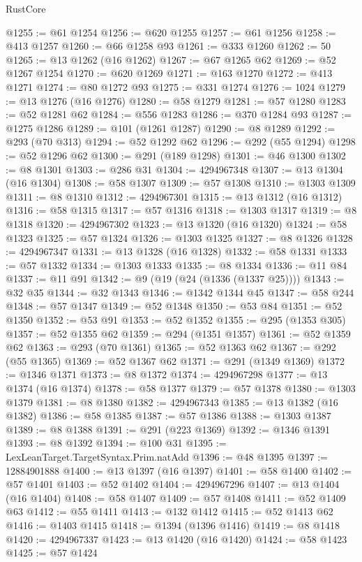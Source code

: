 \begin{lexlean}{RustCore}
\begin{coremodule}
@1255 := @61 @1254
@1256 := @620 @1255
@1257 := @61 @1256
@1258 := @413 @1257
@1260 := @66 @1258 @93
@1261 := @333 @1260
@1262 := 50
@1265 := @13 @1262 (@16 @1262)
@1267 := @67 @1265 @62
@1269 := @52 @1267 @1254
@1270 := @620 @1269
@1271 := @163 @1270
@1272 := @413 @1271
@1274 := @80 @1272 @93
@1275 := @331 @1274
@1276 := 1024
@1279 := @13 @1276 (@16 @1276)
@1280 := @58 @1279
@1281 := @57 @1280
@1283 := @52 @1281 @62
@1284 := @556 @1283
@1286 := @370 @1284 @93
@1287 := @1275 @1286
@1289 := @101 (@1261 @1287)
@1290 := @8 @1289
@1292 := @293 (@70 @313)
@1294 := @52 @1292 @62
@1296 := @292 (@55 @1294)
@1298 := @52 @1296 @62
@1300 := @291 (@189 @1298)
@1301 := @46 @1300
@1302 := @8 @1301
@1303 := @286 @31
@1304 := 4294967348
@1307 := @13 @1304 (@16 @1304)
@1308 := @58 @1307
@1309 := @57 @1308
@1310 := @1303 @1309
@1311 := @8 @1310
@1312 := 4294967301
@1315 := @13 @1312 (@16 @1312)
@1316 := @58 @1315
@1317 := @57 @1316
@1318 := @1303 @1317
@1319 := @8 @1318
@1320 := 4294967302
@1323 := @13 @1320 (@16 @1320)
@1324 := @58 @1323
@1325 := @57 @1324
@1326 := @1303 @1325
@1327 := @8 @1326
@1328 := 4294967347
@1331 := @13 @1328 (@16 @1328)
@1332 := @58 @1331
@1333 := @57 @1332
@1334 := @1303 @1333
@1335 := @8 @1334
@1336 := @11 @84
@1337 := @11 @91
@1342 := @9 (@19 (@24 (@1336 (@1337 @25))))
@1343 := @32 @35
@1344 := @32 @1343
@1346 := @1342 @1344 @45
@1347 := @58 @244
@1348 := @57 @1347
@1349 := @52 @1348
@1350 := @53 @84
@1351 := @52 @1350
@1352 := @53 @91
@1353 := @52 @1352
@1355 := @295 (@1353 @305)
@1357 := @52 @1355 @62
@1359 := @294 (@1351 @1357)
@1361 := @52 @1359 @62
@1363 := @293 (@70 @1361)
@1365 := @52 @1363 @62
@1367 := @292 (@55 @1365)
@1369 := @52 @1367 @62
@1371 := @291 (@1349 @1369)
@1372 := @1346 @1371
@1373 := @8 @1372
@1374 := 4294967298
@1377 := @13 @1374 (@16 @1374)
@1378 := @58 @1377
@1379 := @57 @1378
@1380 := @1303 @1379
@1381 := @8 @1380
@1382 := 4294967343
@1385 := @13 @1382 (@16 @1382)
@1386 := @58 @1385
@1387 := @57 @1386
@1388 := @1303 @1387
@1389 := @8 @1388
@1391 := @291 (@223 @1369)
@1392 := @1346 @1391
@1393 := @8 @1392
@1394 := @100 @31
@1395 := LexLeanTarget.TargetSyntax.Prim.natAdd
@1396 := @48 @1395
@1397 := 12884901888
@1400 := @13 @1397 (@16 @1397)
@1401 := @58 @1400
@1402 := @57 @1401
@1403 := @52 @1402
@1404 := 4294967296
@1407 := @13 @1404 (@16 @1404)
@1408 := @58 @1407
@1409 := @57 @1408
@1411 := @52 @1409 @63
@1412 := @55 @1411
@1413 := @132 @1412
@1415 := @52 @1413 @62
@1416 := @1403 @1415
@1418 := @1394 (@1396 @1416)
@1419 := @8 @1418
@1420 := 4294967337
@1423 := @13 @1420 (@16 @1420)
@1424 := @58 @1423
@1425 := @57 @1424

\end{coremodule}
\end{lexlean}
